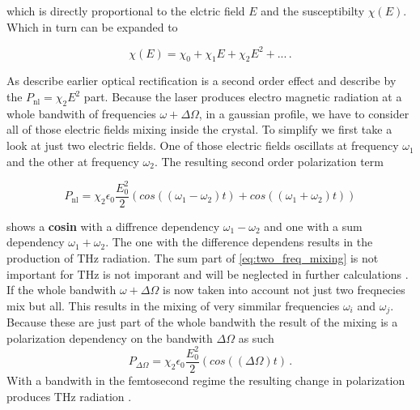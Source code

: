 which is directly proportional to the elctric field $E$ and the susceptibilty $\chi(E)$.
Which in turn can be expanded to 

\begin{equation}
    \chi(E) = \chi_0 + \chi_1 E +\chi_2 E^2 + ...   \, .
\end{equation}

As describe earlier optical rectification is a second order effect and describe by the $P_\text{nl} = \chi_2 E^2$ part.
Because the laser produces electro magnetic radiation at a whole bandwith of frequencies $\omega + \Delta\Omega$, in a gaussian profile, we have to consider all of those electric fields mixing inside the crystal.
To simplify we first take a look at just two electric fields.
One of those electric fields oscillats at frequency $\omega_1$ and the other at frequency $\omega_2$.
The resulting second order polarization term 

\begin{equation}
    P_\text{nl} = \chi_2 \epsilon_0 \frac{E_0^2}{2}\left(cos((\omega_1 - \omega_2)t) + cos((\omega_1 + \omega_2)t)\right)
\label{eq:two_freq_mixing}
\end{equation}

shows a \textbf{cosin} with a diffrence dependency $\omega_1-\omega_2$ and one with a sum dependency $\omega_1+\omega_2$.
The one with the difference dependens results in the production of $\si{\tera\hertz}$ radiation. %
The sum part of \eqref{eq:two_freq_mixing} is not important for $\si{\tera\hertz}$ is not imporant and will be neglected in further calculations \cite[45--46]{wiki_book}.
If the whole bandwith $\omega + \Delta\Omega$ is now taken into account not just two freqnecies mix but all.
This results in the mixing of very simmilar frequencies $\omega_i$ and $\omega_j$.
Because these are just part of the whole bandwith the result of the mixing is a polarization dependency on the bandwith $\Delta\Omega$ as such
\begin{equation}
    P_{\Delta\Omega} = \chi_2 \epsilon_0 \frac{E_0^2}{2}\left(cos((\Delta\Omega)t) \, .
\end{equation}
With a bandwith in the femtosecond regime the resulting change in polarization produces $\si{\tera\hertz}$ radiation \cite[289--291]{book_optical_rectification}\cite[46]{wiki_book}.



